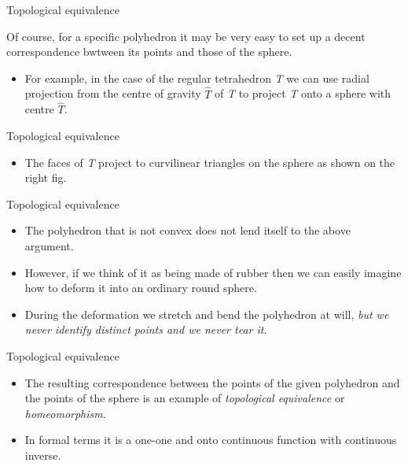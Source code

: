 \documentclass{beamer}
\begin{document}
\begin{frame}{Topological equivalence}
  \begin{block}{}
    Of course, for a specific polyhedron it may be very easy to set up a decent correspondence bwtween its points and those of the sphere.
    \begin{itemize}
    \item For example, in the case of the regular tetrahedron \textsl{T} we can use radial projection from the centre of gravity $\hat T$ of \textsl{T} to project \textsl{T} onto a sphere with centre $\hat T$.
    \end{itemize}
  \end{block}
\end{frame}

\begin{frame}{Topological equivalence}
  \begin{block}{}
    \begin{itemize}
    \item The faces of \textsl{T} project to curvilinear triangles on the sphere as shown on the right fig.
    \end{itemize}
  \end{block}
\end{frame}

\begin{frame}{Topological equivalence}
  \begin{block}{}
    \begin{itemize}
    \item The polyhedron that is not convex does not lend itself to the above argument.
    \item However, if we think of it as being made of rubber then we can easily imagine how to deform it into an ordinary round sphere.
    \item During the deformation we stretch and bend the polyhedron at will, \textsl{but we never identify distinct points and we never tear it}.
    \end{itemize}
  \end{block}
\end{frame}

\begin{frame}{Topological equivalence}
  \begin{block}{}
    \begin{itemize}
    \item The resulting correspondence between the points of the given polyhedron and the points of the sphere is an example of \textsl{topological equivalence} or \textsl{homeomorphism}.
    \item In formal terms it is a one-one and onto continuous function with continuous inverse.
    \end{itemize}
  \end{block}
\end{frame}
\end{document}
